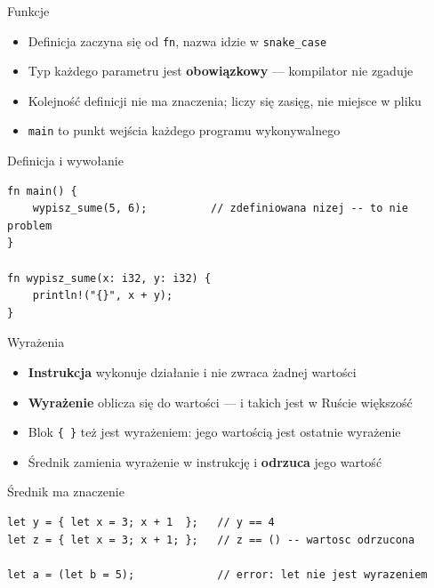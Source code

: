 \begin{frame}[fragile]{Funkcje}
  \begin{itemize}
    \item Definicja zaczyna się od \texttt{fn}, nazwa idzie w \texttt{snake\_case}
    \item Typ każdego parametru jest \textbf{obowiązkowy} --- kompilator nie zgaduje
    \item Kolejność definicji nie ma znaczenia; liczy się zasięg, nie miejsce w pliku
    \item \texttt{main} to punkt wejścia każdego programu wykonywalnego
  \end{itemize}
  \begin{block}{Definicja i wywołanie}
\begin{lstlisting}
fn main() {
    wypisz_sume(5, 6);          // zdefiniowana nizej -- to nie problem
}

fn wypisz_sume(x: i32, y: i32) {
    println!("{}", x + y);
}
\end{lstlisting}
  \end{block}
\end{frame}

\begin{frame}[fragile]{Wyrażenia}
  \begin{itemize}
    \item \textbf{Instrukcja} wykonuje działanie i nie zwraca żadnej wartości
    \item \textbf{Wyrażenie} oblicza się do wartości --- i takich jest w Ruście większość
    \item Blok \texttt{\{\ \}} też jest wyrażeniem: jego wartością jest ostatnie wyrażenie
    \item Średnik zamienia wyrażenie w instrukcję i \textbf{odrzuca} jego wartość
  \end{itemize}
  \begin{block}{Średnik ma znaczenie}
\begin{lstlisting}
let y = { let x = 3; x + 1  };   // y == 4
let z = { let x = 3; x + 1; };   // z == () -- wartosc odrzucona

let a = (let b = 5);             // error: let nie jest wyrazeniem
\end{lstlisting}
  \end{block}
\end{frame}

